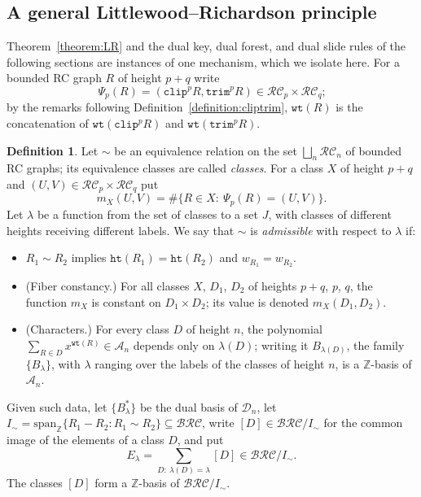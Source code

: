 \documentclass{amsart}
\theoremstyle{definition}
\newtheorem{definition}[lemma]{Definition}
\theoremstyle{remark}
\numberwithin{equation}{subsection}
\newcommand{\wof}[1]{w_{#1}}
\newcommand{\wtt}{\mathtt{wt}}
\newcommand{\trm}{\mathtt{trim}}
\newcommand{\hr}{\mathtt{ht}}
\newcommand{\clp}{\mathtt{clip}}
\newcommand{\BRC}{\mathcal{BRC}}
\newcommand{\RC}{\mathcal{RC}}
\newcommand{\dsch}{\ensuremath{\Xi}}
\newcommand{\coma}{\mathcal{A}}
\newcommand{\dcoma}{\mathcal{D}}
\begin{document}

\subsection{A general Littlewood--Richardson principle}\label{section:template}

Theorem~\ref{theorem:LR} and the dual key, dual forest, and dual slide rules of the following sections are instances of one mechanism, which we isolate here. For a bounded RC graph $R$ of height $p+q$ write
$$\Psi_p(R)=(\clp^pR,\trm^pR)\in\RC_p\times\RC_q\text{;}$$
by the remarks following Definition~\ref{definition:cliptrim}, $\wtt(R)$ is the concatenation of $\wtt(\clp^pR)$ and $\wtt(\trm^pR)$.

\begin{definition}\label{definition:admissible}
Let $\sim$ be an equivalence relation on the set $\bigsqcup_n\RC_n$ of bounded RC graphs; its equivalence classes are called \emph{classes}. For a class $X$ of height $p+q$ and $(U,V)\in\RC_p\times\RC_q$ put
$$m_X(U,V)=\#\{R\in X:\ \Psi_p(R)=(U,V)\}\text{.}$$
Let $\lambda$ be a function from the set of classes to a set $J$, with classes of different heights receiving different labels. We say that $\sim$ is \emph{admissible} with respect to $\lambda$ if:
\begin{itemize}
\item[(H1)] $R_1\sim R_2$ implies $\hr(R_1)=\hr(R_2)$ and $\wof{R_1}=\wof{R_2}$.
\item[(H2)] (Fiber constancy.) For all classes $X$, $D_1$, $D_2$ of heights $p+q$, $p$, $q$, the function $m_X$ is constant on $D_1\times D_2$; its value is denoted $m_X(D_1,D_2)$.
\item[(H3)] (Characters.) For every class $D$ of height $n$, the polynomial $\sum_{R\in D}x^{\wtt(R)}\in\coma_n$ depends only on $\lambda(D)$; writing it $B_{\lambda(D)}$, the family $\{B_\lambda\}$, with $\lambda$ ranging over the labels of the classes of height $n$, is a $\mathbb Z$-basis of $\coma_n$.
\end{itemize}
Given such data, let $\{B_\lambda^*\}$ be the dual basis of $\dcoma_n$, let $I_\sim=\mathrm{span}_{\mathbb Z}\{R_1-R_2:R_1\sim R_2\}\subseteq\BRC$, write $[D]\in\BRC/I_\sim$ for the common image of the elements of a class $D$, and put
$$E_\lambda=\sum_{D:\ \lambda(D)=\lambda}[D]\in\BRC/I_\sim\text{.}$$
The classes $[D]$ form a $\mathbb Z$-basis of $\BRC/I_\sim$.
\end{definition}
\end{document}
